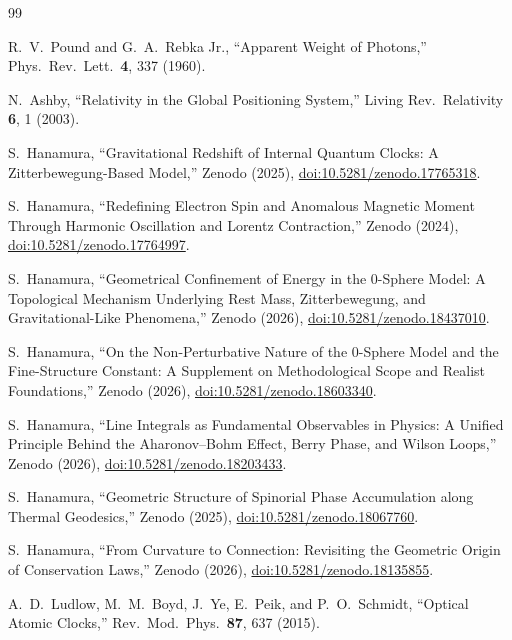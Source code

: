 \documentclass[%
 reprint,
 amsmath,amssymb,
 aps,
 prb,
]{revtex4-2}
\numberwithin{equation}{section}
\begin{document}
\begin{thebibliography}{99}

R.~V.~Pound and G.~A.~Rebka Jr.,
``Apparent Weight of Photons,''
Phys.\ Rev.\ Lett.\ \textbf{4}, 337 (1960).

N.~Ashby,
``Relativity in the Global Positioning System,''
Living Rev.\ Relativity \textbf{6}, 1 (2003).

S.~Hanamura,
``Gravitational Redshift of Internal Quantum Clocks: A Zitterbewegung-Based Model,''
Zenodo (2025), \href{https://doi.org/10.5281/zenodo.17765318}{doi:10.5281/zenodo.17765318}.

S.~Hanamura,
``Redefining Electron Spin and Anomalous Magnetic Moment Through Harmonic Oscillation and Lorentz Contraction,''
Zenodo (2024), \href{https://doi.org/10.5281/zenodo.17764997}{doi:10.5281/zenodo.17764997}.

S.~Hanamura,
``Geometrical Confinement of Energy in the 0-Sphere Model: A Topological Mechanism Underlying Rest Mass, Zitterbewegung, and Gravitational-Like Phenomena,''
Zenodo (2026), \href{https://doi.org/10.5281/zenodo.18437010}{doi:10.5281/zenodo.18437010}.

S.~Hanamura,
``On the Non-Perturbative Nature of the 0-Sphere Model and the Fine-Structure Constant: A Supplement on Methodological Scope and Realist Foundations,''
Zenodo (2026), \href{https://doi.org/10.5281/zenodo.18603340}{doi:10.5281/zenodo.18603340}.

S.~Hanamura,
``Line Integrals as Fundamental Observables in Physics: A Unified Principle Behind the Aharonov--Bohm Effect, Berry Phase, and Wilson Loops,''
Zenodo (2026), \href{https://doi.org/10.5281/zenodo.18203433}{doi:10.5281/zenodo.18203433}.

S.~Hanamura,
``Geometric Structure of Spinorial Phase Accumulation along Thermal Geodesics,''
Zenodo (2025), \href{https://doi.org/10.5281/zenodo.18067760}{doi:10.5281/zenodo.18067760}.

S.~Hanamura,
``From Curvature to Connection: Revisiting the Geometric Origin of Conservation Laws,''
Zenodo (2026), \href{https://doi.org/10.5281/zenodo.18135855}{doi:10.5281/zenodo.18135855}.

A.~D.~Ludlow, M.~M.~Boyd, J.~Ye, E.~Peik, and P.~O.~Schmidt,
``Optical Atomic Clocks,''
Rev.\ Mod.\ Phys.\ \textbf{87}, 637 (2015).


\end{thebibliography}
\end{document}
